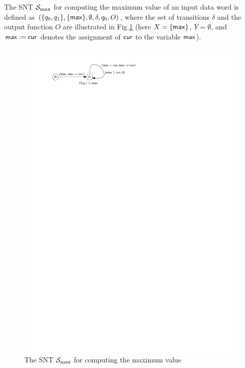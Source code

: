 \begin{example}
The SNT ${\mathcal{S} }_{\max}$ for computing the maximum value of an input data word is defined as $(\{q_0,q_1\}, \{\mathsf{max}\}, \emptyset, \delta, q_0, O)$, where the set of transitions $\delta$ and the output function $O$ are illustrated in Fig.\ref{fig-snt-exmp}
%
(here $X=\{\mathsf{max}\}$, $Y=\emptyset$, and $\mathsf{max}:=\mathsf{cur}$ denotes the assignment of $\mathsf{cur}$ to the variable $\mathsf{max}$).
\begin{figure}[htbp]
\begin{center}
\includegraphics{snt-exmp.pdf}
\caption{The SNT ${\mathcal{S} }_{\max}$ for computing the maximum value}
\label{fig-snt-exmp}
\end{center}
\end{figure}
\end{example}

